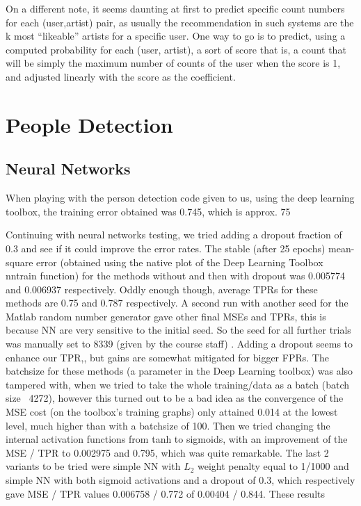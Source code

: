 \documentclass{article} %
\begin{document}
On a different note, it seems daunting at first to predict specific count numbers for each (user,artist) pair, as usually the recommendation in such systems are the k most “likeable” artists for a specific user. One way to go is to predict, using a computed probability for each (user, artist), a sort of score that is, a count that will be simply the maximum number of counts of the user when the score is 1, and adjusted linearly with the score as the coefficient.

\section{People Detection}
\subsection{Neural Networks}
When playing with the person detection code given to us, using the deep learning toolbox, the training error obtained was 0.745, which is approx. 75%

Continuing with neural networks testing, we tried adding a dropout fraction of 0.3 and see if it could improve the error rates. The stable (after 25 epochs) mean-square error (obtained using the native plot of the Deep Learning Toolbox nntrain function) for the methods without and then with dropout was 0.005774 and 0.006937 respectively. Oddly enough though, average TPRs for these methods are 0.75 and 0.787 respectively. A second run with another seed for the Matlab random number generator gave other final MSEs and TPRs, this is because NN are very sensitive to the initial seed. So the seed for all further trials was manually set to 8339 (given by the course staff) . Adding a dropout seems to enhance our TPR,, but gains are somewhat mitigated for bigger FPRs. The batchsize for these methods (a parameter in the Deep Learning toolbox) was also tampered with, when we tried to take the whole training/data as a batch (batch size ~4272), however this turned out to be a bad idea as the convergence of the MSE cost (on the toolbox’s training graphs) only attained 0.014 at the lowest level, much higher than with a batchsize of 100. Then we tried changing the internal activation functions from tanh to sigmoids, with an improvement of the MSE / TPR to 0.002975 and 0.795, which was quite remarkable. The last 2 variants to be tried were simple NN with $L_2$ weight penalty equal to 1/1000 and simple NN with both sigmoid activations and a dropout of 0.3, which respectively gave MSE / TPR values 0.006758 / 0.772 of 0.00404 / 0.844. These results 
\end{document}
